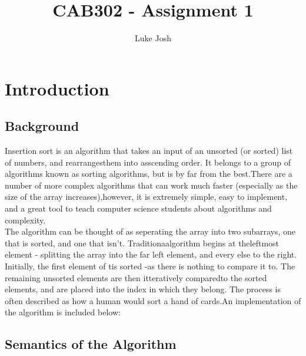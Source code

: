 \documentclass{article}
\title{CAB302 - Assignment 1}
\author{Luke Josh}
\begin{document}

\maketitle
\tableofcontents
\pagebreak

\section{Introduction}
    \subsection{Background}
    Insertion sort is an algorithm that takes an input of an unsorted (or sorted) list of numbers, and rearrangesthem into asscending order. It belongs to a group of algorithms known as sorting algorithms, but is by far from the best.There are a number of more complex algorithms that can work much faster (especially as the size of the array increases),however, it is extremely simple, easy to implement, and a great tool to teach computer science students about algorithms and complexity.\\
    The algorithm can be thought of as seperating the array into two subarrays, one that is sorted, and one that isn't. Traditionaalgorithm begins at theleftmost element - splitting the array into the far left element, and every else to the right. Initially, the first element of tis sorted -as there is nothing to compare it to. The remaining unsorted elements are then itteratively comparedto the sorted elements, and are placed into the index in which they belong. The process is often described as how a human would sort a hand of cards.An implementation of the algorithm is included below:\linebreak

    \subsection{Semantics of the Algorithm}
        \begin{algorithmic}
                    \EndWhile
                \EndFor
            \EndFunction
        \end{algorithmic}
\end{document}
